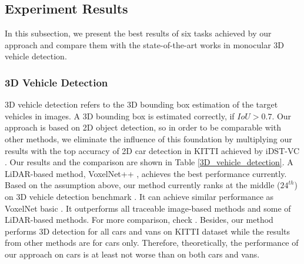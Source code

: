 \subsection{Experiment Results}
\label{exp_res}
In this subsection, we present the best results of six tasks achieved by our approach and compare them with the state-of-the-art works in monocular 3D vehicle detection.

\subsubsection{3D Vehicle Detection}
3D vehicle detection refers to the 3D bounding box estimation of the target vehicles in images. A 3D bounding box is estimated correctly, if $IoU>0.7$. Our approach is based on 2D object detection, so in order to be comparable with other methods, we eliminate the influence of this foundation by multiplying our results with the top accuracy of 2D car detection in KITTI achieved by iDST-VC \cite{2dobject}. Our results and the comparison are shown in Table \ref{3D_vehicle_detection}. A LiDAR-based method, VoxelNet++ \cite{DBLP:journals/corr/abs-1711-06396}, achieves the best performance currently. Based on the assumption above, our method currently ranks at the middle ($24^{th}$) on 3D vehicle detection benchmark \cite{3dobject}. It can achieve similar performance as VoxelNet basic \cite{DBLP:journals/corr/abs-1711-06396}. It outperforms all traceable image-based methods and some of LiDAR-based methods. For more comparison, check \cite{3dobject}. Besides, our method performs 3D detection for all cars and vans on KITTI dataset while the results from other methods are for cars only. Therefore, theoretically, the performance of our approach on cars is at least not worse than on both cars and vans. 


